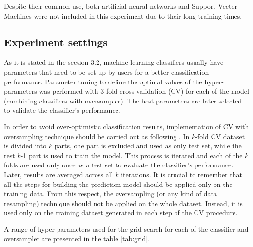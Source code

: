 \documentclass[remotesensing,article,submit,moreauthors,pdftex]{Definitions/mdpi}
\begin{document}
Despite their common use, both artificial neural networks and Support Vector
Machines were not included in this experiment due to their long training times.

\subsection{Experiment settings}

As it is stated in the section 3.2, machine-learning classifiers usually have
parameters that need to be set up by users for a better classification
performance. Parameter tuning to define the optimal values of the
hyper-parameters was performed with 3-fold cross-validation (CV) for each of the
model (combining classifiers with oversampler). The best parameters are later
selected to validate the classifier's performance.

In order to avoid over-optimistic classification results, implementation of CV
with oversampling technique should be carried out as following \cite{Lusa2015}.
In $k$-fold CV dataset is divided into $k$ parts, one part is excluded and used
as only test set, while the rest $k$-1 part is used to train the model. This
process is iterated and each of the $k$ folds are used only once as a test set
to evaluate the classifier's performance. Later, results are averaged across all
$k$ iterations. It is crucial to remember that all the steps for building the
prediction model should be applied only on the training data. From this respect,
the oversampling (or any kind of data resampling) technique should not be
applied on the whole dataset. Instead, it is used only on the training dataset
generated in each step of the CV procedure.

A range of hyper-parameters used for the grid search for each of the classifier
and oversampler are presented in the table \ref{tab:grid}.
\end{document}
